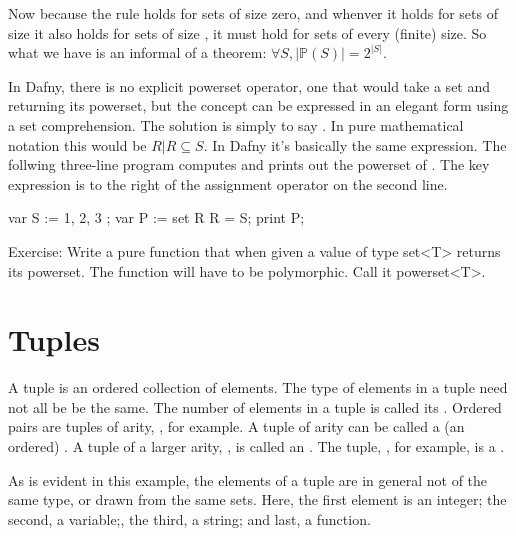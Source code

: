 \documentclass[letterpaper,10pt,english]{sphinxmanual}
\begin{document}
Now because the rule holds for sets of size zero, and whenver it holds
for sets of size  it also holds for sets of size , it must
hold for sets of every (finite) size. So what we have is an informal
 of a theorem: \(\forall S, |{\mathbb P}(S)|
= 2^{|S|}\).

In Dafny, there is no explicit powerset operator, one that would take
a set and returning its powerset, but the concept can be expressed in
an elegant form using a set comprehension. The solution is simply to
say . In pure
mathematical notation this would be \({ R | R \subseteq S }.\) In
Dafny it’s basically the same expression.  The follwing three-line
program computes and prints out the powerset of .
The key expression is to the right of the assignment operator on the
second line.

\begin{sphinxVerbatim}[commandchars=\\\{\}]
var S := \PYGZob{} 1, 2, 3 \PYGZcb{};
var P := set R \textbar{} R \PYGZlt{}= S;
print P;
\end{sphinxVerbatim}

Exercise: Write a pure function that when given a value of type set\textless{}T\textgreater{}
returns its powerset. The function will have to be polymorphic.  Call
it powerset\textless{}T\textgreater{}.


\section{Tuples}
\label{\detokenize{07-set-theory:tuples}}
A tuple is an ordered collection of elements. The type of elements in
a tuple need not all be be the same. The number of elements in a tuple
is called its . Ordered pairs are tuples of arity, , for
example. A tuple of arity  can be called a (an ordered) .
A tuple of a larger arity, , is called an .  The tuple,
, for example, is a .

As is evident in this example, the elements of a tuple are in general
not of the same type, or drawn from the same sets. Here, the first
element is an integer; the second, a variable;, the third, a string;
and last, a function.
\end{document}
